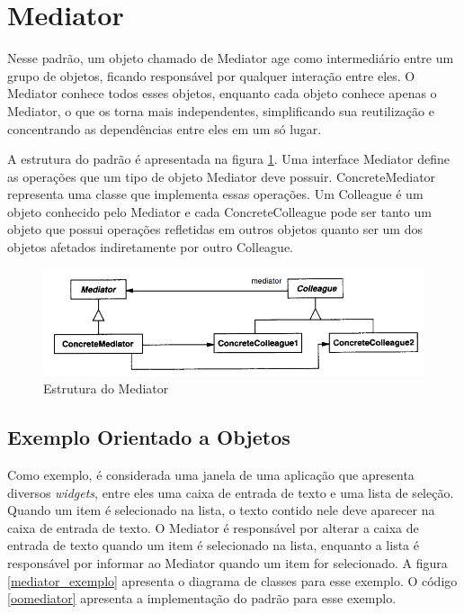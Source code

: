 \section{Mediator}


Nesse padrão, um objeto chamado de Mediator age como intermediário 
entre um grupo de objetos, ficando responsável por qualquer 
interação entre eles. O Mediator conhece todos 
esses objetos, enquanto cada objeto conhece apenas o 
Mediator, o que os torna 
mais independentes, simplificando sua reutilização
 e concentrando as dependências entre eles 
em um só lugar. 

A estrutura do padrão é apresentada na figura \ref{mediator_struct}. 
Uma interface Mediator define as operações que um tipo de 
objeto Mediator deve possuir. ConcreteMediator representa 
uma classe que implementa essas operações. Um Colleague 
é um objeto conhecido pelo Mediator e cada ConcreteColleague 
pode ser tanto um objeto que possui operações refletidas 
em outros objetos quanto ser um dos objetos afetados 
indiretamente por outro Colleague.

\begin{figure}[htb]
	\caption{\label{mediator_struct}Estrutura do Mediator}
	\begin{center}
	    \includegraphics[scale=0.5]{5_padroes-contexto-funcional/5.3_comportamentais/5.3.05_mediator/diagram.png}
	\end{center}
\end{figure}



\subsection*{Exemplo Orientado a Objetos}

Como exemplo, é considerada uma janela de uma aplicação 
que apresenta diversos \textit{widgets}, entre eles uma caixa 
de entrada de texto e uma lista de seleção. Quando um item é 
selecionado na lista, o texto contido nele deve aparecer 
na caixa de entrada de texto. O Mediator é responsável 
por alterar a caixa de entrada de texto quando um item 
é selecionado na lista, enquanto a lista é responsável 
por informar ao Mediator quando um item for selecionado. 
A figura \ref{mediator_exemplo} apresenta o diagrama 
de classes para esse exemplo. O código \ref{oomediator} 
apresenta a implementação do padrão para esse exemplo.

